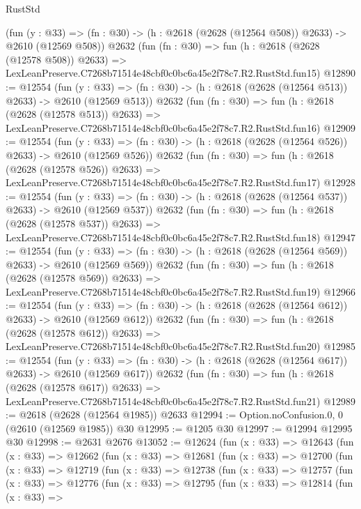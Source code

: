 \begin{lexlean}{RustStd}
\begin{coremodule}
    (fun (y : @33) => (fn : @30) -> (h : @2618 (@2628 (@12564 @508)) @2633) -> @2610 (@12569 @508))
    @2632
    (fun (fn : @30) =>
    fun (h : @2618 (@2628 (@12578 @508)) @2633) =>
    LexLeanPreserve.C7268b71514e48cbf0c0bc6a45e2f78c7.R2.RustStd.fun15)
@12890 := @12554
    (fun (y : @33) => (fn : @30) -> (h : @2618 (@2628 (@12564 @513)) @2633) -> @2610 (@12569 @513))
    @2632
    (fun (fn : @30) =>
    fun (h : @2618 (@2628 (@12578 @513)) @2633) =>
    LexLeanPreserve.C7268b71514e48cbf0c0bc6a45e2f78c7.R2.RustStd.fun16)
@12909 := @12554
    (fun (y : @33) => (fn : @30) -> (h : @2618 (@2628 (@12564 @526)) @2633) -> @2610 (@12569 @526))
    @2632
    (fun (fn : @30) =>
    fun (h : @2618 (@2628 (@12578 @526)) @2633) =>
    LexLeanPreserve.C7268b71514e48cbf0c0bc6a45e2f78c7.R2.RustStd.fun17)
@12928 := @12554
    (fun (y : @33) => (fn : @30) -> (h : @2618 (@2628 (@12564 @537)) @2633) -> @2610 (@12569 @537))
    @2632
    (fun (fn : @30) =>
    fun (h : @2618 (@2628 (@12578 @537)) @2633) =>
    LexLeanPreserve.C7268b71514e48cbf0c0bc6a45e2f78c7.R2.RustStd.fun18)
@12947 := @12554
    (fun (y : @33) => (fn : @30) -> (h : @2618 (@2628 (@12564 @569)) @2633) -> @2610 (@12569 @569))
    @2632
    (fun (fn : @30) =>
    fun (h : @2618 (@2628 (@12578 @569)) @2633) =>
    LexLeanPreserve.C7268b71514e48cbf0c0bc6a45e2f78c7.R2.RustStd.fun19)
@12966 := @12554
    (fun (y : @33) => (fn : @30) -> (h : @2618 (@2628 (@12564 @612)) @2633) -> @2610 (@12569 @612))
    @2632
    (fun (fn : @30) =>
    fun (h : @2618 (@2628 (@12578 @612)) @2633) =>
    LexLeanPreserve.C7268b71514e48cbf0c0bc6a45e2f78c7.R2.RustStd.fun20)
@12985 := @12554
    (fun (y : @33) => (fn : @30) -> (h : @2618 (@2628 (@12564 @617)) @2633) -> @2610 (@12569 @617))
    @2632
    (fun (fn : @30) =>
    fun (h : @2618 (@2628 (@12578 @617)) @2633) =>
    LexLeanPreserve.C7268b71514e48cbf0c0bc6a45e2f78c7.R2.RustStd.fun21)
@12989 := @2618 (@2628 (@12564 @1985)) @2633
@12994 := Option.noConfusion.{0, 0} (@2610 (@12569 @1985)) @30
@12995 := @1205 @30
@12997 := @12994 @12995 @30
@12998 := @2631 @2676
@13052 := @12624
    (fun (x : @33) =>
    @12643
      (fun (x : @33) =>
      @12662
        (fun (x : @33) =>
        @12681
          (fun (x : @33) =>
          @12700
            (fun (x : @33) =>
            @12719
              (fun (x : @33) =>
              @12738
                (fun (x : @33) =>
                @12757
                  (fun (x : @33) =>
                  @12776
                    (fun (x : @33) =>
                    @12795
                      (fun (x : @33) =>
                      @12814
                        (fun (x : @33) =>

\end{coremodule}
\end{lexlean}

